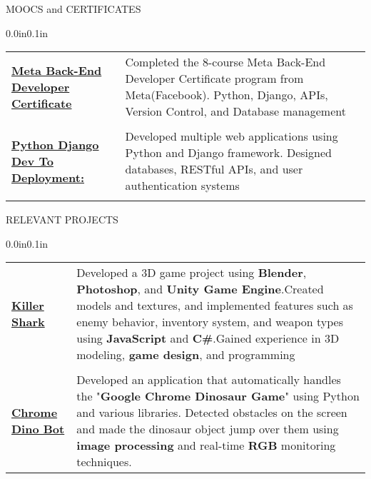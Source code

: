 \documentclass{resume} %
\makeatletter
\newcommand{\entry}[2]{#1 & #2 \tabularnewline} %
\newcommand{\tableEnv}[2]{%
  \begin{rSection}{#1} %
    \begin{adjustwidth}{0.0in}{0.1in} %
      \begin{tabularx}{\linewidth}{@{} >{\bfseries}l @{\hspace{6ex}} X @{}}
        #2 %
      \end{tabularx}
    \end{adjustwidth}
  \end{rSection}
}
\makeatother
\begin{document}

\tableEnv{MOOCS and CERTIFICATES}{
    \entry{\href{https://www.coursera.org/account/accomplishments/verify/V6YN75AHGPUS}{Meta Back-End Developer Certificate}}{Completed the 8-course Meta Back-End Developer Certificate program from Meta(Facebook). Python, Django, APIs, Version Control, and Database management}
    \\
    \entry{\href{https://www.udemy.com/certificate/UC-5262a28e-8f1d-4e48-988b-75ad1b517a60/}{Python Django Dev To Deployment:}}{Developed multiple web applications using Python and Django framework. Designed databases, RESTful APIs, and user authentication systems}
    \\
    
}

\tableEnv{RELEVANT PROJECTS}{
    \entry{\href{https://github.com/SumanAchary/KillerShark_onlyScripts}{Killer Shark}}{Developed a 3D game project using \textbf{Blender}, \textbf{Photoshop}, and\textbf{ Unity Game Engine}.Created models and textures, and implemented features such as enemy behavior, inventory system, and
weapon types using \textbf{JavaScript} and \textbf{C#}.Gained experience in 3D modeling,\textbf{ game design}, and programming}
\\
 \entry{\href{https://github.com/SumanAchary/Dino-Bot/blob/master/bot.py}{Chrome Dino Bot}}{Developed an application that automatically handles the "\textbf{Google Chrome Dinosaur Game}" using Python and various libraries. Detected obstacles on the screen and made the dinosaur object jump over them using \textbf{image processing} and real-time \textbf{RGB} monitoring techniques.}
}

\end{document}
